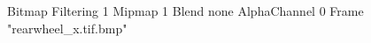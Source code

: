 {Bitmap
	{Filtering 1}
	{Mipmap 1}
	{Blend none}
	{AlphaChannel 0}
	{Frame "rearwheel_x.tif.bmp"}
}

